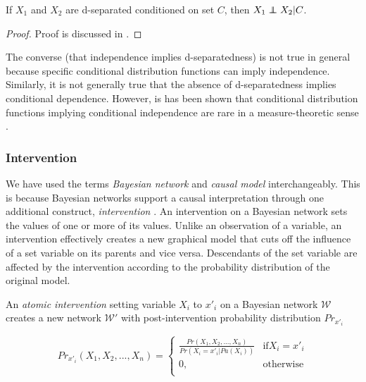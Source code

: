\documentclass[../thesis.tex]{subfiles}
\newcommand{\W}{\mathcal{W}} %
\begin{document}
\begin{thm}\label{thm:d-seperated}
  If \(X_1\) and \(X_2\) are d-separated conditioned on set \(C\),
  then $X_1 \independent X_2 \vert C$.
\end{thm}

\begin{proof}
  Proof is discussed in \citet{koller2003multi}.
\end{proof}
\hfill
\hfill

The converse (that independence implies d-separatedness) is
not true in general because specific conditional distribution
functions can imply independence.
Similarly, it is not generally
true that the absence of d-separatedness implies conditional
dependence.
However, is has been shown that conditional distribution functions
implying conditional independence are rare
in a measure-theoretic sense
\cite{geiger1990logical,meek1995strong,koller2003multi}.

\subsubsection{Intervention}

We have used the terms \emph{Bayesian network} and
\emph{causal model} interchangeably.
This is because Bayesian networks support a causal
interpretation through one additional construct,
\emph{intervention} \cite{pearl1993bayesian}.
An intervention on a Bayesian network sets
the values of one or more of its values.
Unlike an observation of a variable,
an intervention effectively creates a new graphical
model that cuts off the
influence of a set variable on its parents and vice versa.
Descendants of the set variable are affected by
the intervention according to the probability
distribution of the original model.

\begin{dfn}[Intervention]
  An \emph{atomic intervention} setting variable
  $X_i$ to $x'_i$ on a Bayesian network $\W$ creates a new
  network $\W'$ with post-intervention probability
  distribution $Pr_{x'_i}$

  $$Pr_{x'_i}(X_1,X_2,...,X_n) = \begin{cases}
               \frac{Pr(X_1,X_2,...,X_n)}{Pr(X_i = x'_i \vert Pa(X_i))} & \text{if} X_i = x'_i \\
               0, & \text{otherwise}\\
  \end{cases}$$
\end{dfn}
\end{document}
